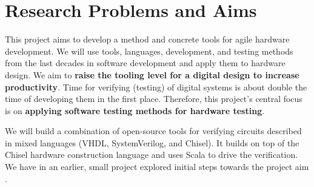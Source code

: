 \documentclass[fleqn,12pt]{article}
\begin{document}
\newpage
\section*{Research Problems and Aims}


This project aims to develop a method and concrete tools for agile hardware development.
We will use tools, languages, development, and testing methods from the last decades in
software development and apply them to hardware design.
We aim to {\bf raise the tooling level for a digital design to increase productivity}.
Time for verifying (testing) of digital systems is about double the time of developing
them in the first place.
Therefore, this project's central focus is on {\bf applying software
testing methods for hardware testing}.

We will build a combination of open-source tools for verifying
circuits described in mixed languages (VHDL, SystemVerilog, and Chisel).
It builds on top of the Chisel hardware construction language and uses Scala to drive the verification.
We have in an earlier, small project explored initial steps towards
the project aim \cite{verify:chisel:2020}.



\end{document}
